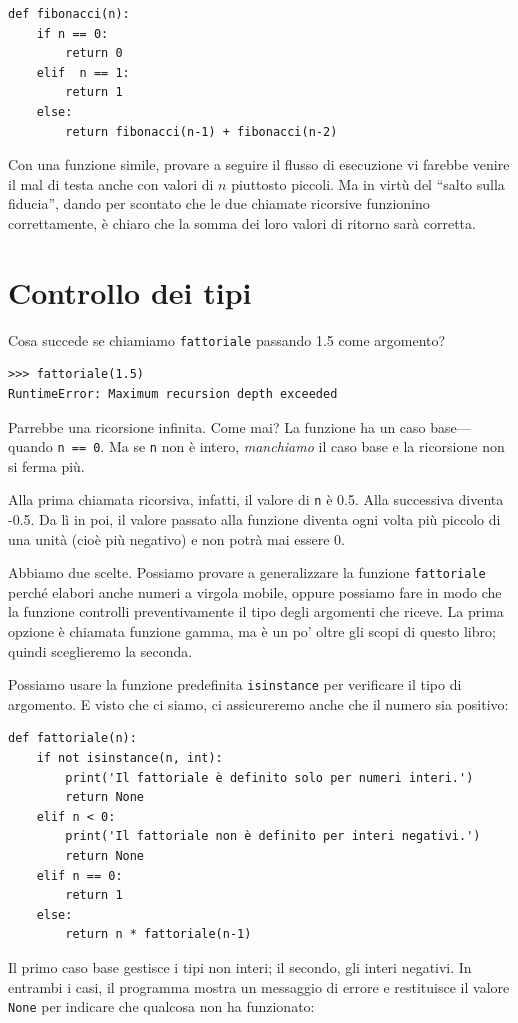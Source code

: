 \documentclass[10pt]{book}
\begin{document}
\begin{verbatim}
def fibonacci(n):
    if n == 0:
        return 0
    elif  n == 1:
        return 1
    else:
        return fibonacci(n-1) + fibonacci(n-2)
\end{verbatim}
%
Con una funzione simile, provare a seguire il flusso di esecuzione vi farebbe venire il mal di testa anche con valori di $n$ piuttosto piccoli. Ma in virtù del ``salto sulla fiducia'', dando per scontato che le due chiamate ricorsive funzionino correttamente, è chiaro che la somma dei loro valori di ritorno sarà corretta.


\section{Controllo dei tipi}
\label{guardian}

Cosa succede se chiamiamo {\tt fattoriale} passando 1.5 come argomento?

\begin{verbatim}
>>> fattoriale(1.5)
RuntimeError: Maximum recursion depth exceeded
\end{verbatim}
%
Parrebbe una ricorsione infinita. Come mai?
La funzione ha un caso base---quando {\tt n == 0}.  Ma se {\tt n} non è intero,
{\em manchiamo} il caso base e la ricorsione non si ferma più.

Alla prima chiamata ricorsiva, infatti, il valore di {\tt n} è 0.5.
Alla successiva diventa -0.5. Da lì in poi, il valore passato alla funzione diventa ogni volta più piccolo di una unità (cioè più negativo) e non potrà mai essere 0.

Abbiamo due scelte. Possiamo provare a generalizzare la funzione {\tt fattoriale} perché elabori anche numeri a virgola mobile, oppure possiamo fare in modo che la funzione controlli preventivamente il tipo degli argomenti che riceve. La prima opzione è chiamata funzione gamma, ma è un po' oltre gli scopi di questo libro; quindi sceglieremo la seconda.

Possiamo usare la funzione predefinita {\tt isinstance} per verificare il tipo di argomento. E visto che ci siamo, ci assicureremo anche che il numero sia positivo:

\begin{verbatim}
def fattoriale(n):
    if not isinstance(n, int):
        print('Il fattoriale è definito solo per numeri interi.')
        return None
    elif n < 0:
        print('Il fattoriale non è definito per interi negativi.')
        return None
    elif n == 0:
        return 1
    else:
        return n * fattoriale(n-1)
\end{verbatim}
%
Il primo caso base gestisce i tipi non interi; il secondo, gli interi negativi. In entrambi i casi, il programma mostra un messaggio di errore e restituisce il valore {\tt None} per indicare che qualcosa non ha funzionato:
\end{document}
